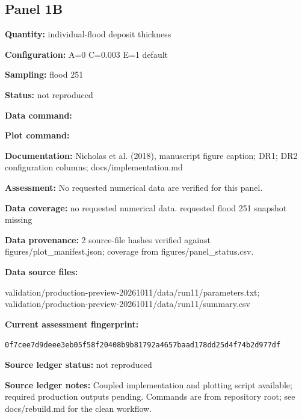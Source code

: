 \subsection*{Panel 1B}
\textbf{Quantity:} individual-flood deposit thickness

\textbf{Configuration:} A=0 C=0.003 E=1 default

\textbf{Sampling:} flood 251

\textbf{Status:} not reproduced

\textbf{Data command:}\par {\small \texttt{}}\par

\textbf{Plot command:}\par {\small \texttt{}}\par

\textbf{Documentation:} Nicholas et al. (2018), manuscript figure caption; DR1; DR2 configuration columns; docs/\allowbreak{}implementation.md

\textbf{Assessment:} No requested numerical data are verified for this panel.

\textbf{Data coverage:} no requested numerical data. requested flood 251 snapshot missing

\textbf{Data provenance:} 2 source-file hashes verified against figures/\allowbreak{}plot\_\allowbreak{}manifest.json; coverage from figures/\allowbreak{}panel\_\allowbreak{}status.csv.

\textbf{Data source files:}\par {\small\raggedright validation/\allowbreak{}production-preview-20261011/\allowbreak{}data/\allowbreak{}run11/\allowbreak{}parameters.txt; validation/\allowbreak{}production-preview-20261011/\allowbreak{}data/\allowbreak{}run11/\allowbreak{}summary.csv\par}

\textbf{Current assessment fingerprint:}\par {\small\texttt{0f7cee7d9deee3eb05f58f20408b9b81792a4657baad178dd25d4f74b2d977df}}\par

\textbf{Source ledger status:} not reproduced

\textbf{Source ledger notes:} Coupled implementation and plotting script available; required production outputs pending. Commands are from repository root; see docs/\allowbreak{}rebuild.md for the clean workflow.

